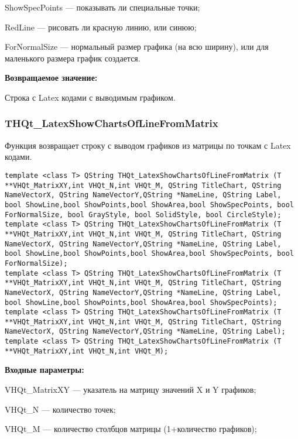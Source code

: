 \documentclass[a4paper,12pt]{article}
\begin{document}
ShowSpecPoints --- показывать ли специальные точки;
 
RedLine --- рисовать ли красную линию, или синюю;
 
ForNormalSize --- нормальный размер графика (на всю ширину), или для маленького размера график создается.
	
\textbf{Возвращаемое значение:}

Строка с Latex кодами с выводимым графиком.


\subsubsection{THQt\_LatexShowChartsOfLineFromMatrix}\label{THQt_LatexShowChartsOfLineFromMatrix}

Функция возвращает строку с выводом графиков из матрицы по точкам с Latex кодами.


\begin{lstlisting}[label=code_syntax_THQt_LatexShowChartsOfLineFromMatrix,caption=Синтаксис]
template <class T> QString THQt_LatexShowChartsOfLineFromMatrix (T **VHQt_MatrixXY,int VHQt_N,int VHQt_M, QString TitleChart, QString NameVectorX, QString NameVectorY,QString *NameLine, QString Label, bool ShowLine,bool ShowPoints,bool ShowArea,bool ShowSpecPoints, bool ForNormalSize, bool GrayStyle, bool SolidStyle, bool CircleStyle);
template <class T> QString THQt_LatexShowChartsOfLineFromMatrix (T **VHQt_MatrixXY,int VHQt_N,int VHQt_M, QString TitleChart, QString NameVectorX, QString NameVectorY,QString *NameLine, QString Label, bool ShowLine,bool ShowPoints,bool ShowArea,bool ShowSpecPoints, bool ForNormalSize);
template <class T> QString THQt_LatexShowChartsOfLineFromMatrix (T **VHQt_MatrixXY,int VHQt_N,int VHQt_M, QString TitleChart, QString NameVectorX, QString NameVectorY,QString *NameLine, QString Label, bool ShowLine,bool ShowPoints,bool ShowArea,bool ShowSpecPoints);
template <class T> QString THQt_LatexShowChartsOfLineFromMatrix (T **VHQt_MatrixXY,int VHQt_N,int VHQt_M, QString TitleChart, QString NameVectorX, QString NameVectorY,QString *NameLine, QString Label);
template <class T> QString THQt_LatexShowChartsOfLineFromMatrix (T **VHQt_MatrixXY,int VHQt_N,int VHQt_M);
\end{lstlisting}

\textbf{Входные параметры:}
 
VHQt\_MatrixXY --- указатель на матрицу значений X и Y графиков;
 
VHQt\_N --- количество точек;
 
VHQt\_M --- количество столбцов матрицы (1+количество графиков);
 
\end{document}
